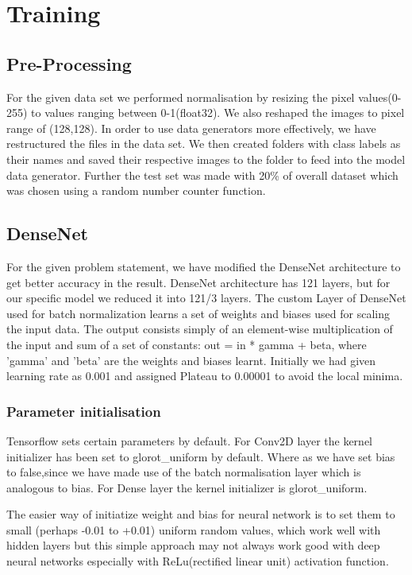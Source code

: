 \documentclass[a4paper,19pt]{article}
\begin{document}
\newpage

\section{Training}
\subsection{Pre-Processing}
For the given data set we performed normalisation by resizing the pixel values(0-255) to values ranging between 0-1(float32). We also reshaped the images to pixel range of (128,128).
In order to use data generators more effectively, we have restructured the files in the data set. We then created folders with class labels as their names and saved their respective images to the folder to feed into the model data generator.
Further the test set was made with 20\% of overall dataset which was chosen using a random number counter function.

\subsection{DenseNet}
For the given problem statement, we have modified the DenseNet architecture to get better accuracy in the result. DenseNet architecture has 121 layers, but for our specific model we reduced it into 121/3 layers. The custom Layer of DenseNet used for batch normalization learns a set of weights and biases used for scaling the input data. The output consists simply of an element-wise multiplication of the input and sum of a set of constants:
\newline out = in * gamma + beta,
\newline where 'gamma' and 'beta' are the weights and biases learnt.
Initially we had given learning rate as 0.001 and assigned Plateau to 0.00001 to avoid the local minima.

\subsubsection{Parameter initialisation}
Tensorflow sets certain parameters by default. 
For Conv2D layer the kernel initializer has been set to glorot\_uniform by default. Where as we have set bias to false,since we have made use of the batch normalisation layer which is analogous to bias. 
\newline For Dense layer the kernel initializer is glorot\_uniform.

\newline The easier way of initiatize weight and bias for neural network is to set them to small (perhaps -0.01 to +0.01) uniform random values, which work well with hidden layers but this simple approach may not always work good with deep neural networks especially with ReLu(rectified linear unit) activation function.
\end{document}
